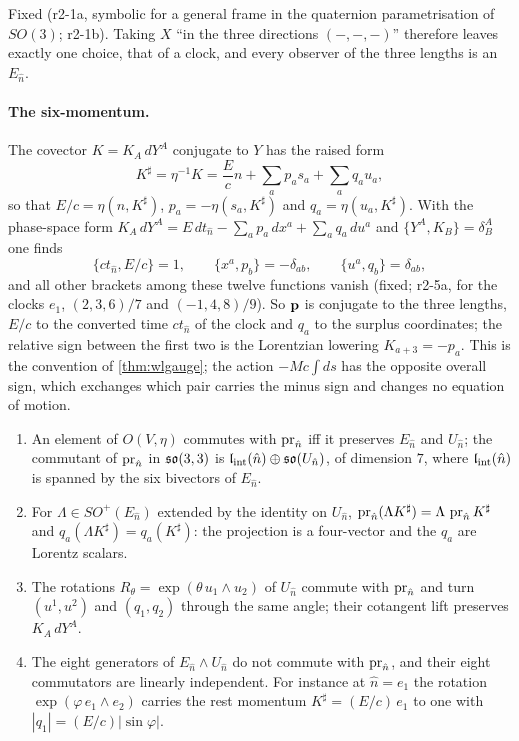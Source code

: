Fixed (r2-1a, symbolic for a general frame in the quaternion parametrisation of $SO(3)$; r2-1b). Taking $X$ ``in the three directions $(-,-,-)$''
therefore leaves exactly one choice, that of a clock, and every observer of the three lengths is an $E_{\hat n}$.

\paragraph{The six-momentum.} The covector $K=K_A\,dY^A$ conjugate to $Y$ has the raised form
\begin{equation}
\label{r2:eq:K}
K^\sharp=\eta^{-1}K=\frac Ecn+\sum_ap_as_a+\sum_aq_au_a,
\end{equation}
so that $E/c=\eta(\hat n,K^\sharp)$, $p_a=-\eta(s_a,K^\sharp)$ and $q_a=\eta(u_a,K^\sharp)$.
With the phase-space form $K_A\,dY^A=E\,dt_{\hat n}-\sum_ap_a\,dx^a+\sum_aq_a\,du^a$ and $\{Y^A,K_B\}=\delta^A_B$ one finds
\[
\{ct_{\hat n},E/c\}=1,\qquad \{x^a,p_b\}=-\delta_{ab},\qquad \{u^a,q_b\}=\delta_{ab},
\]
and all other brackets among these twelve functions vanish (fixed; r2-5a, for the clocks $e_1$, $(2,3,6)/7$ and $(-1,4,8)/9$). So $\mathbf p$ is conjugate to the three lengths, $E/c$
to the converted time $ct_{\hat n}$ of the clock and $q_a$ to the surplus coordinates; the relative sign between the first two is the Lorentzian lowering
$K_{a+3}=-p_a$. This is the convention of \cref{thm:wlgauge}; the action $-Mc\int ds$ has the opposite overall
sign, which exchanges which pair carries the minus sign and changes no equation of motion.

\begin{proposition}
\label{r2:prop:cov}
\begin{enumerate}[label=(\roman*),leftmargin=2.2em]
\item An element of $O(V,\eta)$ commutes with $\operatorname{pr}_{\hat n}$ iff it preserves $E_{\hat n}$ and $U_{\hat n}$; the commutant of $\operatorname{pr}_{\hat n}$ in $\mathfrak{so}(3,3)$ is
$\mathfrak l_{\rm int}(\hat n)\oplus\mathfrak{so}(U_{\hat n})$, of dimension $7$, where $\mathfrak l_{\rm int}(\hat n)$ is spanned by the six bivectors of $E_{\hat n}$.
\item For $\Lambda\in SO^+(E_{\hat n})$ extended by the identity on $U_{\hat n}$, $\operatorname{pr}_{\hat n}(\Lambda K^\sharp)=\Lambda\,\operatorname{pr}_{\hat n}K^\sharp$ and
$q_a(\Lambda K^\sharp)=q_a(K^\sharp)$: the projection is a four-vector and the $q_a$ are Lorentz scalars.
\item The rotations $R_\theta=\exp(\theta\,u_1\wedge u_2)$ of $U_{\hat n}$ commute with $\operatorname{pr}_{\hat n}$ and turn $(u^1,u^2)$ and $(q_1,q_2)$ through the same
angle; their cotangent lift preserves $K_A\,dY^A$.
\item The eight generators of $E_{\hat n}\wedge U_{\hat n}$ do not commute with $\operatorname{pr}_{\hat n}$, and their eight commutators are linearly independent. For instance
at $\hat n=e_1$ the rotation $\exp(\varphi\,e_1\wedge e_2)$ carries the rest momentum $K^\sharp=(E/c)\,e_1$ to one with $|q_1|=(E/c)|\sin\varphi|$.
\end{enumerate}
\end{proposition}

